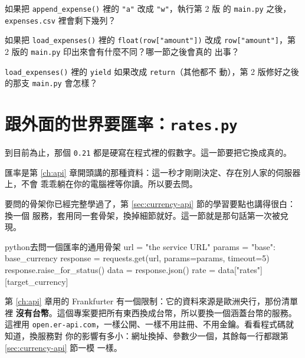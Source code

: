 
\begin{drills}[label=drills:capstone-storage]
\item 如果把 \texttt{append\_expense()} 裡的 \texttt{"a"} 改成 \texttt{"w"}，執行第 2 版
的 \texttt{main.py} 之後，\texttt{expenses.csv} 裡會剩下幾列？
\item 如果把 \texttt{load\_expenses()} 裡的 \texttt{float(row["amount"])} 改成
\texttt{row["amount"]}，第 2 版的 \texttt{main.py} 印出來會有什麼不同？哪一節之後會真的
出事？
\item \texttt{load\_expenses()} 裡的 \texttt{yield} 如果改成 \texttt{return}（其他都不
動），第 2 版修好之後的那支 \texttt{main.py} 會怎樣？
\end{drills}

\section{跟外面的世界要匯率：\texttt{rates.py}}
\label{sec:capstone-rates}

到目前為止，那個 \texttt{0.21} 都是硬寫在程式裡的假數字。這一節要把它換成真的。

匯率是第 \ref{ch:api} 章開頭講的那種資料：這一秒才剛剛決定、存在別人家的伺服器上，不會
乖乖躺在你的電腦裡等你讀。所以要去問。

要問的骨架你已經完整學過了，第 \ref{sec:currency-api} 節的學習要點也講得很白：換一個
服務，套用同一套骨架，換掉細節就好。這一節就是那句話第一次被兌現。

\begin{code}{python}{去問一個匯率的通用骨架}
url = "the service URL"
params = {"base": base_currency}
response = requests.get(url, params=params, timeout=5)
response.raise_for_status()
data = response.json()
rate = data["rates"][target_currency]
\end{code}

第 \ref{ch:api} 章用的 Frankfurter 有一個限制：它的資料來源是歐洲央行，那份清單裡\textbf{
沒有台幣}。這個專案要把所有東西換成台幣，所以要換一個涵蓋台幣的服務。這裡用
\texttt{open.er-api.com}，一樣公開、一樣不用註冊、不用金鑰。看看程式碼就知道，換服務對
你的影響有多小：網址換掉、參數少一個，其餘每一行都跟第 \ref{sec:currency-api} 節一模
一樣。

